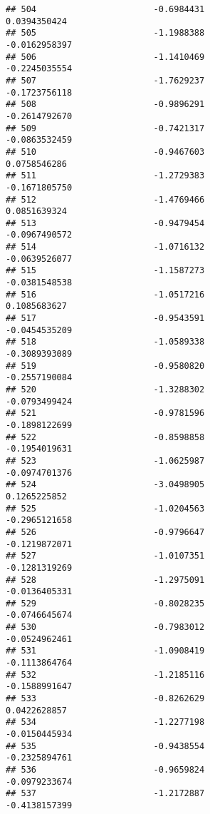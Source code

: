 \documentclass[
]{article}
\begin{document}
\begin{verbatim}
## 504                       -0.6984431                          0.0394350424
## 505                       -1.1988388                         -0.0162958397
## 506                       -1.1410469                         -0.2245035554
## 507                       -1.7629237                         -0.1723756118
## 508                       -0.9896291                         -0.2614792670
## 509                       -0.7421317                         -0.0863532459
## 510                       -0.9467603                          0.0758546286
## 511                       -1.2729383                         -0.1671805750
## 512                       -1.4769466                          0.0851639324
## 513                       -0.9479454                         -0.0967490572
## 514                       -1.0716132                         -0.0639526077
## 515                       -1.1587273                         -0.0381548538
## 516                       -1.0517216                          0.1085683627
## 517                       -0.9543591                         -0.0454535209
## 518                       -1.0589338                         -0.3089393089
## 519                       -0.9580820                         -0.2557190084
## 520                       -1.3288302                         -0.0793499424
## 521                       -0.9781596                         -0.1898122699
## 522                       -0.8598858                         -0.1954019631
## 523                       -1.0625987                         -0.0974701376
## 524                       -3.0498905                          0.1265225852
## 525                       -1.0204563                         -0.2965121658
## 526                       -0.9796647                         -0.1219872071
## 527                       -1.0107351                         -0.1281319269
## 528                       -1.2975091                         -0.0136405331
## 529                       -0.8028235                         -0.0746645674
## 530                       -0.7983012                         -0.0524962461
## 531                       -1.0908419                         -0.1113864764
## 532                       -1.2185116                         -0.1588991647
## 533                       -0.8262629                          0.0422628857
## 534                       -1.2277198                         -0.0150445934
## 535                       -0.9438554                         -0.2325894761
## 536                       -0.9659824                         -0.0979233674
## 537                       -1.2172887                         -0.4138157399

\end{verbatim}
\end{document}
